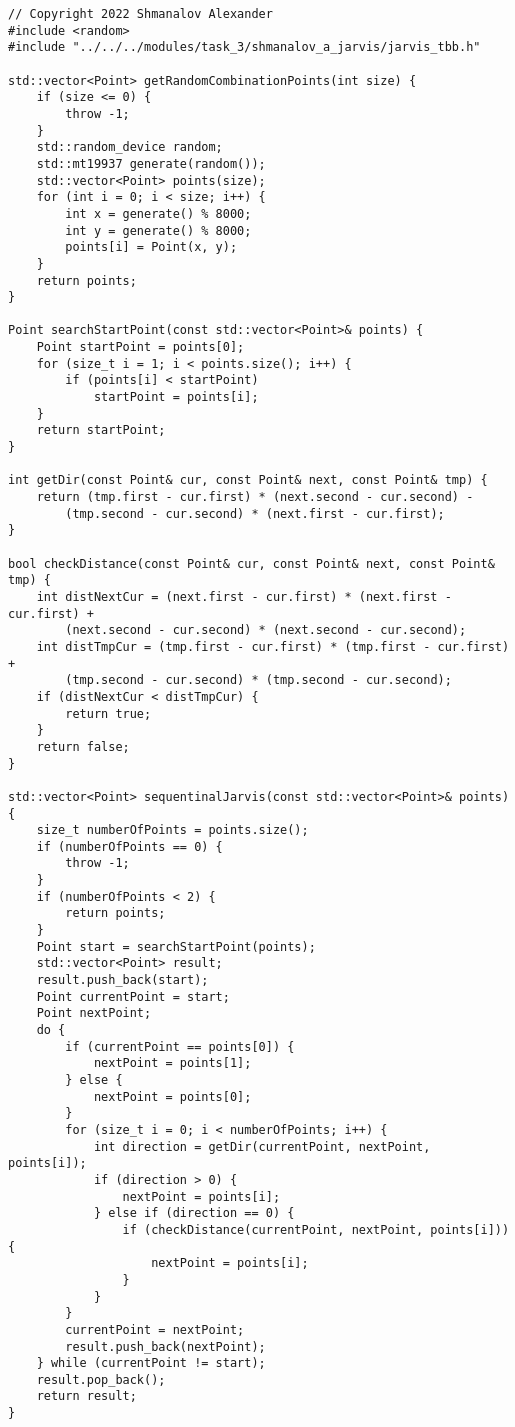 \documentclass{report}
\begin{document}
\begin{lstlisting}
// Copyright 2022 Shmanalov Alexander
#include <random>
#include "../../../modules/task_3/shmanalov_a_jarvis/jarvis_tbb.h"

std::vector<Point> getRandomCombinationPoints(int size) {
    if (size <= 0) {
        throw -1;
    }
    std::random_device random;
    std::mt19937 generate(random());
    std::vector<Point> points(size);
    for (int i = 0; i < size; i++) {
        int x = generate() % 8000;
        int y = generate() % 8000;
        points[i] = Point(x, y);
    }
    return points;
}

Point searchStartPoint(const std::vector<Point>& points) {
    Point startPoint = points[0];
    for (size_t i = 1; i < points.size(); i++) {
        if (points[i] < startPoint)
            startPoint = points[i];
    }
    return startPoint;
}

int getDir(const Point& cur, const Point& next, const Point& tmp) {
    return (tmp.first - cur.first) * (next.second - cur.second) -
        (tmp.second - cur.second) * (next.first - cur.first);
}

bool checkDistance(const Point& cur, const Point& next, const Point& tmp) {
    int distNextCur = (next.first - cur.first) * (next.first - cur.first) +
        (next.second - cur.second) * (next.second - cur.second);
    int distTmpCur = (tmp.first - cur.first) * (tmp.first - cur.first) +
        (tmp.second - cur.second) * (tmp.second - cur.second);
    if (distNextCur < distTmpCur) {
        return true;
    }
    return false;
}

std::vector<Point> sequentinalJarvis(const std::vector<Point>& points) {
    size_t numberOfPoints = points.size();
    if (numberOfPoints == 0) {
        throw -1;
    }
    if (numberOfPoints < 2) {
        return points;
    }
    Point start = searchStartPoint(points);
    std::vector<Point> result;
    result.push_back(start);
    Point currentPoint = start;
    Point nextPoint;
    do {
        if (currentPoint == points[0]) {
            nextPoint = points[1];
        } else {
            nextPoint = points[0];
        }
        for (size_t i = 0; i < numberOfPoints; i++) {
            int direction = getDir(currentPoint, nextPoint, points[i]);
            if (direction > 0) {
                nextPoint = points[i];
            } else if (direction == 0) {
                if (checkDistance(currentPoint, nextPoint, points[i])) {
                    nextPoint = points[i];
                }
            }
        }
        currentPoint = nextPoint;
        result.push_back(nextPoint);
    } while (currentPoint != start);
    result.pop_back();
    return result;
}


\end{lstlisting}
\end{document}
